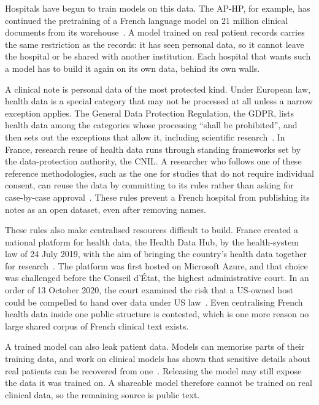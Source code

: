 \begin{reviewrewrite}
Hospitals have begun to train models on this data. The AP-HP, for example, has continued the pretraining of a French language model on 21 million clinical documents from its warehouse~\citep{dura_learning_2022}. A model trained on real patient records carries the same restriction as the records: it has seen personal data, so it cannot leave the hospital or be shared with another institution. Each hospital that wants such a model has to build it again on its own data, behind its own walls.
\end{reviewrewrite}

\begin{reviewrewrite}
A clinical note is personal data of the most protected kind. Under European law, health data is a special category that may not be processed at all unless a narrow exception applies. The General Data Protection Regulation, the GDPR, lists health data among the categories whose processing ``shall be prohibited'', and then sets out the exceptions that allow it, including scientific research~\citep{gdpr_art9}. In France, research reuse of health data runs through standing frameworks set by the data-protection authority, the CNIL. A researcher who follows one of these reference methodologies, such as the one for studies that do not require individual consent, can reuse the data by committing to its rules rather than asking for case-by-case approval~\citep{cnil_mr004}. These rules prevent a French hospital from publishing its notes as an open dataset, even after removing names.
\end{reviewrewrite}

\begin{reviewrewrite}
These rules also make centralised resources difficult to build. France created a national platform for health data, the Health Data Hub, by the health-system law of 24 July 2019, with the aim of bringing the country's health data together for research~\citep{hdh_loi}. The platform was first hosted on Microsoft Azure, and that choice was challenged before the Conseil d'\'Etat, the highest administrative court. In an order of 13 October 2020, the court examined the risk that a US-owned host could be compelled to hand over data under US law~\citep{ce_hdh}. Even centralising French health data inside one public structure is contested, which is one more reason no large shared corpus of French clinical text exists.
\end{reviewrewrite}

\begin{reviewrewrite}
A trained model can also leak patient data. Models can memorise parts of their training data, and work on clinical models has shown that sensitive details about real patients can be recovered from one~\citep{lehman_naacl_2021}. Releasing the model may still expose the data it was trained on. A shareable model therefore cannot be trained on real clinical data, so the remaining source is public text.
\end{reviewrewrite}

